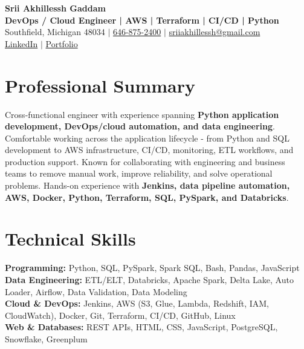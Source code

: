 \documentclass[letterpaper,10pt]{article}
\begin{document}
\fontsize{9.35pt}{10.45pt}\selectfont

\begin{center}
    {\LARGE \textbf{Srii Akhillessh Gaddam}} \\[-1pt]
    \textbf{DevOps / Cloud Engineer | AWS | Terraform | CI/CD | Python} \\[2pt]
    Southfield, Michigan 48034 $|$
    \href{tel:6468752400}{646-875-2400} $|$
    \href{mailto:sriiakhillessh@gmail.com}{sriiakhillessh@gmail.com} \\[1pt]
    \href{https://www.linkedin.com/in/srii-akhiilessh-gaddam-b48668191/}{LinkedIn} $|$
    \href{https://sriiakhillesshg.github.io/portfolio/}{Portfolio}
\end{center}
\vspace{-8pt}

\section{Professional Summary}
\small{Cross-functional engineer with experience spanning \textbf{Python application development, DevOps/cloud automation, and data engineering}. Comfortable working across the application lifecycle - from Python and SQL development to AWS infrastructure, CI/CD, monitoring, ETL workflows, and production support. Known for collaborating with engineering and business teams to remove manual work, improve reliability, and solve operational problems. Hands-on experience with \textbf{Jenkins, data pipeline automation, AWS, Docker, Python, Terraform, SQL, PySpark, and Databricks}.}

\section{Technical Skills}
\small{
\textbf{Programming:} Python, SQL, PySpark, Spark SQL, Bash, Pandas, JavaScript \\
\textbf{Data Engineering:} ETL/ELT, Databricks, Apache Spark, Delta Lake, Auto Loader, Airflow, Data Validation, Data Modeling \\
\textbf{Cloud \& DevOps:} Jenkins, AWS (S3, Glue, Lambda, Redshift, IAM, CloudWatch), Docker, Git, Terraform, CI/CD, GitHub, Linux \\
\textbf{Web \& Databases:} REST APIs, HTML, CSS, JavaScript, PostgreSQL, Snowflake, Greenplum
}
\end{document}
